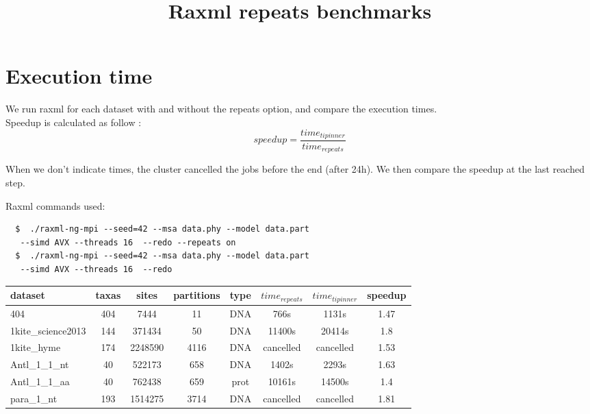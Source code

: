 \documentclass[a4paper]{article}
\begin{document}
\newcommand*{\figuretitle}[1]{%
    {\centering%
    \textbf{#1}%
    \par\medskip}%
}


\title{Raxml repeats benchmarks}
\maketitle


\section{Execution time}

\noindent We run raxml for each dataset with and without the repeats option, and compare the execution times.\\


\noindent Speedup is calculated as follow :  
$$ speedup = \frac{time_{tipinner}}{time_{repeats}}$$

When we don't indicate times, the cluster cancelled the jobs before the end (after 24h). We then compare the speedup at the last reached step. \newline

Raxml commands used:
\lstset{language=sh}
\begin{lstlisting}
  $  ./raxml-ng-mpi --seed=42 --msa data.phy --model data.part
   --simd AVX --threads 16  --redo --repeats on
  $  ./raxml-ng-mpi --seed=42 --msa data.phy --model data.part
   --simd AVX --threads 16  --redo
\end{lstlisting}


\begin{tabular}{|l|c|c|c|c|c|c|c|}
\hline dataset                    & taxas & sites    & partitions & type & $time_{repeats}$ & $time_{tipinner}$ & speedup\\
\hline 404                        & 404   &  7444    & 11         & DNA  & 766s             &  1131s            & 1.47  \\
\hline 1kite\_science2013         & 144   &  371434  & 50         & DNA  & 11400s           &  20414s           & 1.8  \\
\hline 1kite\_hyme                & 174   &  2248590 & 4116       & DNA  & cancelled        &  cancelled        & 1.53 \\
\hline Antl\_1\_1\_nt             & 40    &  522173  & 658        & DNA  & 1402s            &  2293s            & 1.63  \\
\hline Antl\_1\_1\_aa             & 40    &  762438  & 659        & prot & 10161s           & 14500s            & 1.4 \\
\hline para\_1\_nt                & 193   &  1514275 & 3714       & DNA  & cancelled        &  cancelled        & 1.81  \\
\hline 
\end{tabular}\newline
\newline
\end{document}
